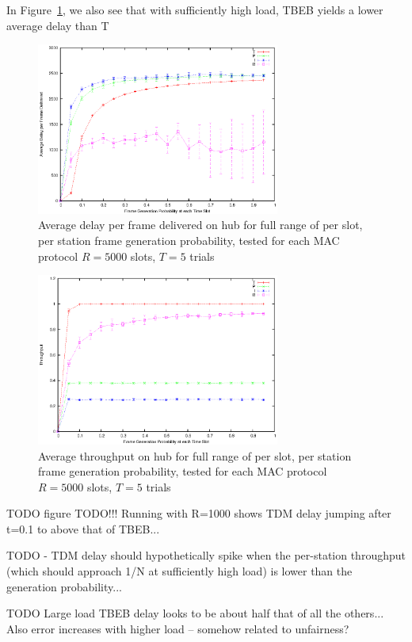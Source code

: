 \documentclass[twocolumn]{article}
\begin{document}
In Figure~\ref{fig:fullrange_delay}, we also see that with sufficiently high load, TBEB yields
a lower average delay than T



\begin{figure}
    \centering \includegraphics[width=8cm]{plots/fullrange_delay5000.eps}
    \caption{Average delay per frame delivered on hub for full range of per
    slot, per station frame generation probability, tested for each MAC
    protocol  $R=5000$ slots, $T = 5$ trials }
    \label{fig:fullrange_delay}
\end{figure}

\begin{figure}
    \centering \includegraphics[width=8cm]{plots/fullrange_throughput5000.eps}
    \caption{Average throughput on hub for full range of per
    slot, per station frame generation probability, tested for each MAC
    protocol  $R=5000$ slots, $T = 5$ trials } 
    \label{fig:fullrange_throughput}
\end{figure}


TODO figure
TODO!!! Running with R=1000 shows TDM delay jumping after t=0.1 to above that of TBEB...

TODO - TDM delay should hypothetically spike when the per-station throughput 
(which should approach 1/N at sufficiently high load) is lower than the generation probability...

TODO Large load TBEB delay looks to be about half that of all the others... Also error increases
with higher load -- somehow related to unfairness?
\end{document}
